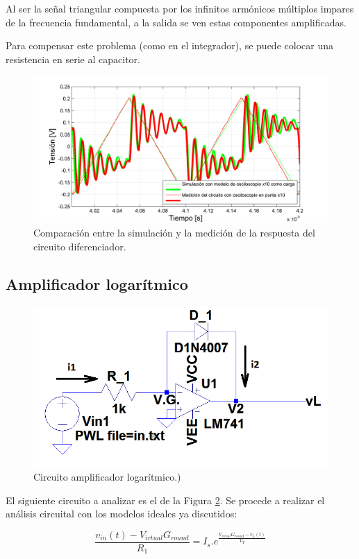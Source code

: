 Al ser la señal triangular compuesta por los infinitos armónicos múltiplos impares de la frecuencia fundamental, a la salida se ven estas componentes amplificadas.

Para compensar este problema (como en el integrador), se puede colocar una resistencia en serie al capacitor.


\begin{figure}[H]
  \centering
\includegraphics[width=1.1\textwidth]{gfx_22/DIFF_M}
  \caption{Comparación entre la simulación y la medición de la respuesta del circuito diferenciador.}
  \label{m:diff}
\end{figure}



\subsection{Amplificador logarítmico}

\begin{figure}[H]
  \centering
\includegraphics[width=.5\textwidth]{gfx_22/circ_log}
  \caption{Circuito amplificador logarítmico.)}
  \label{circ:log}
\end{figure}


El siguiente circuito a analizar es el de la Figura \ref{circ:log}. Se procede a realizar el análisis circuital con los modelos ideales ya discutidos:

\begin{equation}
\frac{v_{in}(t)-V_{irtual}G_{round}}{R_1}= I_s.e^{\frac{V_{irtual}G_{round}-v_L(t)}{V_T}}
\end{equation}

